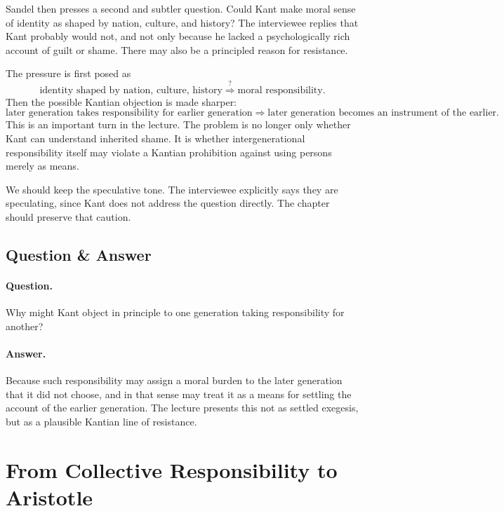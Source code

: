 Sandel then presses a second and subtler question. Could Kant make moral sense of identity as shaped by nation, culture, and history? The interviewee replies that Kant probably would not, and not only because he lacked a psychologically rich account of guilt or shame. There may also be a principled reason for resistance.

The pressure is first posed as
\begin{equation}
\text{identity shaped by nation, culture, history}
\stackrel{?}{\Longrightarrow}
\text{moral responsibility}.
\end{equation}
Then the possible Kantian objection is made sharper:
\begin{equation}
\text{later generation takes responsibility for earlier generation}
\Longrightarrow
\text{later generation becomes an instrument of the earlier}.
\end{equation}
This is an important turn in the lecture. The problem is no longer only whether Kant can understand inherited shame. It is whether intergenerational responsibility itself may violate a Kantian prohibition against using persons merely as means.

We should keep the speculative tone. The interviewee explicitly says they are speculating, since Kant does not address the question directly. The chapter should preserve that caution.

\subsection{Question \& Answer}

\paragraph{Question.} Why might Kant object in principle to one generation taking responsibility for another?

\paragraph{Answer.} Because such responsibility may assign a moral burden to the later generation that it did not choose, and in that sense may treat it as a means for settling the account of the earlier generation. The lecture presents this not as settled exegesis, but as a plausible Kantian line of resistance.

\section{From Collective Responsibility to Aristotle}


